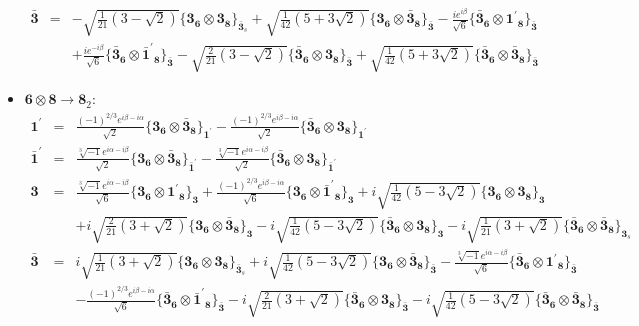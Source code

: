 \documentclass[english]{article}
\newcommand{\subcg}[3]{\big\{ {#1}\otimes{#2}\big\}^{}_{#3}}
\newcommand{\rep}[1]{\mathbf{#1}}
\begin{document}
\begin{itemize}
\begin{eqnarray*}
\\
\rep{\bar{3}} &=& -\sqrt{\frac{1}{21} \left(3-\sqrt{2}\right)}\subcg{\rep{3}_{\rep{6}}}{\rep{3}_{\rep{8}}}{\rep{\bar{3}}_{s}}+\sqrt{\frac{1}{42} \left(5+3 \sqrt{2}\right)}\subcg{\rep{3}_{\rep{6}}}{\rep{\bar{3}}_{\rep{8}}}{\rep{\bar{3}}}-\frac{i e^{i \beta }}{\sqrt{6}}\subcg{\rep{\bar{3}}_{\rep{6}}}{\rep{1^{\prime}}_{\rep{8}}}{\rep{\bar{3}}} \\ 
 & & +\frac{i e^{-i \beta }}{\sqrt{6}}\subcg{\rep{\bar{3}}_{\rep{6}}}{\rep{\bar{1}^{\prime}}_{\rep{8}}}{\rep{\bar{3}}}-\sqrt{\frac{2}{21} \left(3-\sqrt{2}\right)}\subcg{\rep{\bar{3}}_{\rep{6}}}{\rep{3}_{\rep{8}}}{\rep{\bar{3}}}+\sqrt{\frac{1}{42} \left(5+3 \sqrt{2}\right)}\subcg{\rep{\bar{3}}_{\rep{6}}}{\rep{\bar{3}}_{\rep{8}}}{\rep{\bar{3}}}
\end{eqnarray*}
\item $\rep{6}\otimes\rep{8}\to\rep{8}_{2}$:
\begin{eqnarray*}
\rep{1^{\prime}} &=& \frac{(-1)^{2/3} e^{i \beta -i \alpha }}{\sqrt{2}}\subcg{\rep{3}_{\rep{6}}}{\rep{\bar{3}}_{\rep{8}}}{\rep{1^{\prime}}}-\frac{(-1)^{2/3} e^{i \beta -i \alpha }}{\sqrt{2}}\subcg{\rep{\bar{3}}_{\rep{6}}}{\rep{3}_{\rep{8}}}{\rep{1^{\prime}}}
\\
\rep{\bar{1}^{\prime}} &=& \frac{\sqrt[3]{-1} e^{i \alpha -i \beta }}{\sqrt{2}}\subcg{\rep{3}_{\rep{6}}}{\rep{\bar{3}}_{\rep{8}}}{\rep{\bar{1}^{\prime}}}-\frac{\sqrt[3]{-1} e^{i \alpha -i \beta }}{\sqrt{2}}\subcg{\rep{\bar{3}}_{\rep{6}}}{\rep{3}_{\rep{8}}}{\rep{\bar{1}^{\prime}}}
\\
\rep{3} &=& \frac{\sqrt[3]{-1} e^{i \alpha -i \beta }}{\sqrt{6}}\subcg{\rep{3}_{\rep{6}}}{\rep{1^{\prime}}_{\rep{8}}}{\rep{3}}+\frac{(-1)^{2/3} e^{i \beta -i \alpha }}{\sqrt{6}}\subcg{\rep{3}_{\rep{6}}}{\rep{\bar{1}^{\prime}}_{\rep{8}}}{\rep{3}}+i \sqrt{\frac{1}{42} \left(5-3 \sqrt{2}\right)}\subcg{\rep{3}_{\rep{6}}}{\rep{3}_{\rep{8}}}{\rep{3}} \\ 
 & & +i \sqrt{\frac{2}{21} \left(3+\sqrt{2}\right)}\subcg{\rep{3}_{\rep{6}}}{\rep{\bar{3}}_{\rep{8}}}{\rep{3}}-i \sqrt{\frac{1}{42} \left(5-3 \sqrt{2}\right)}\subcg{\rep{\bar{3}}_{\rep{6}}}{\rep{3}_{\rep{8}}}{\rep{3}}-i \sqrt{\frac{1}{21} \left(3+\sqrt{2}\right)}\subcg{\rep{\bar{3}}_{\rep{6}}}{\rep{\bar{3}}_{\rep{8}}}{\rep{3}_{s}}
\\
\rep{\bar{3}} &=& i \sqrt{\frac{1}{21} \left(3+\sqrt{2}\right)}\subcg{\rep{3}_{\rep{6}}}{\rep{3}_{\rep{8}}}{\rep{\bar{3}}_{s}}+i \sqrt{\frac{1}{42} \left(5-3 \sqrt{2}\right)}\subcg{\rep{3}_{\rep{6}}}{\rep{\bar{3}}_{\rep{8}}}{\rep{\bar{3}}}-\frac{\sqrt[3]{-1} e^{i \alpha -i \beta }}{\sqrt{6}}\subcg{\rep{\bar{3}}_{\rep{6}}}{\rep{1^{\prime}}_{\rep{8}}}{\rep{\bar{3}}} \\ 
 & & -\frac{(-1)^{2/3} e^{i \beta -i \alpha }}{\sqrt{6}}\subcg{\rep{\bar{3}}_{\rep{6}}}{\rep{\bar{1}^{\prime}}_{\rep{8}}}{\rep{\bar{3}}}-i \sqrt{\frac{2}{21} \left(3+\sqrt{2}\right)}\subcg{\rep{\bar{3}}_{\rep{6}}}{\rep{3}_{\rep{8}}}{\rep{\bar{3}}}-i \sqrt{\frac{1}{42} \left(5-3 \sqrt{2}\right)}\subcg{\rep{\bar{3}}_{\rep{6}}}{\rep{\bar{3}}_{\rep{8}}}{\rep{\bar{3}}}
\end{eqnarray*}
\end{itemize}
\end{document}
